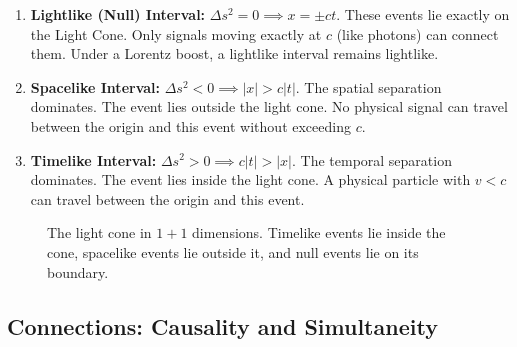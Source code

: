 \begin{enumerate}
    \item \textbf{Lightlike (Null) Interval:} $\Delta s^2 = 0 \implies x = \pm c t$. 
    These events lie exactly on the Light Cone. Only signals moving exactly at $c$ (like photons) can connect them. Under a Lorentz boost, a lightlike interval remains lightlike.
    
    \item \textbf{Spacelike Interval:} $\Delta s^2 < 0 \implies |x| > c|t|$.
    The spatial separation dominates. The event lies outside the light cone. No physical signal can travel between the origin and this event without exceeding $c$.
    
    \item \textbf{Timelike Interval:} $\Delta s^2 > 0 \implies c|t| > |x|$.
    The temporal separation dominates. The event lies inside the light cone. A physical particle with $v < c$ can travel between the origin and this event. 
\end{enumerate}

\begin{figure}[h]
    \centering
    \caption{The light cone in $1+1$ dimensions. Timelike events lie inside
    the cone, spacelike events lie outside it, and null events lie on its boundary.}
    \label{fig:lec04:light-cone}
\end{figure}

\subsection*{Connections: Causality and Simultaneity}

